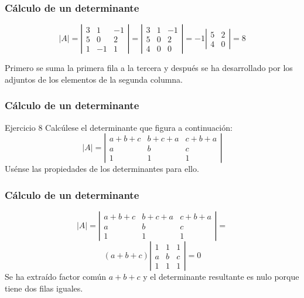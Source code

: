 \documentclass[aspectratio=169]{beamer}
\begin{document}
\begin{frame}
  \frametitle{C\'alculo de un determinante}
\[|A| = \left|\begin{array}{ccc}3 & 1 & -1 \\5 & 0 & 2 \\1 & -1 & 1\end{array}\right| = 
\left|\begin{array}{ccc}3 & 1 & -1 \\5 & 0 & 2 \\4 & 0 & 0\end{array}\right| = 
-1 \left|\begin{array}{cc}5 & 2 \\4 & 0\end{array}\right| = 8 \]

Primero se suma la primera fila a la tercera y despu\'es se ha desarrollado por los adjuntos de los elementos de la segunda columna.
\end{frame} 

\begin{frame}
  \frametitle{C\'alculo de un determinante}
     \begin{block}{Ejercicio 8}
Calc\'ulese el determinante que figura a continuaci\'on:
\[|A| = \left|\begin{array}{ccc}a+b+c & b+c+a & c+b+a \\a & b & c \\1 & 1 & 1\end{array}\right|\]
Us\'ense las propiedades de los determinantes para ello.
\end{block}
\end{frame} 


\begin{frame}
  \frametitle{C\'alculo de un determinante}
\[|A| = \left|\begin{array}{ccc}a+b+c & b+c+a & c+b+a \\a & b & c \\1 & 1 & 1\end{array}\right| = \]
\[
(a+b+c) \left|\begin{array}{ccc}1 & 1 & 1 \\a & b & c \\1 & 1 & 1\end{array}\right|  = 0\]
Se ha extra\'ido factor com\'un $a + b + c$ y el determinante resultante es nulo porque tiene dos filas iguales.
\end{frame} 
\end{document}
